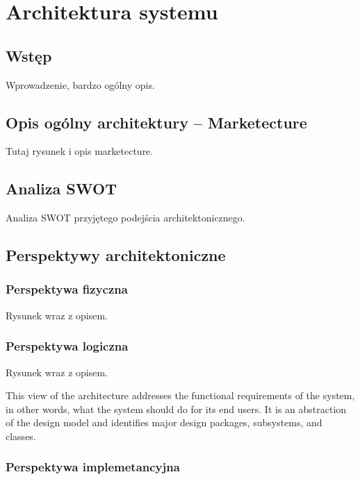 \chapter{Architektura systemu}
\label{Chapter5}

\section{Wstęp}
\label{Chapter51}

Wprowadzenie, bardzo ogólny opis. 

\section{Opis ogólny architektury -- Marketecture}
\label{Chapter52}

Tutaj rysunek i opis marketecture.

\section{Analiza SWOT}
\label{Chapter53}

Analiza SWOT przyjętego podejścia architektonicznego.

\section{Perspektywy architektoniczne}
\label{Chapter54}

\subsection{Perspektywa fizyczna}

Rysunek wraz z opisem.

\subsection{Perspektywa logiczna}

Rysunek wraz z opisem.

This view of the architecture addresses the functional requirements of the system, in other words, what the system should do for its end users. It is an abstraction of the design model and identifies major design packages, subsystems, and classes.


\subsection{Perspektywa implemetancyjna}

